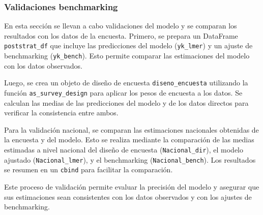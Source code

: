 \documentclass[
  12pt,
]{book}
\begin{document}
\hypertarget{validaciones-benchmarking-1}{%
\subsubsection*{Validaciones benchmarking}\label{validaciones-benchmarking-1}}

En esta sección se llevan a cabo validaciones del modelo y se comparan los resultados con los datos de la encuesta. Primero, se prepara un DataFrame \texttt{poststrat\_df} que incluye las predicciones del modelo (\texttt{yk\_lmer}) y un ajuste de benchmarking (\texttt{yk\_bench}). Esto permite comparar las estimaciones del modelo con los datos observados.

Luego, se crea un objeto de diseño de encuesta \texttt{diseno\_encuesta} utilizando la función \texttt{as\_survey\_design} para aplicar los pesos de encuesta a los datos. Se calculan las medias de las predicciones del modelo y de los datos directos para verificar la consistencia entre ambos.

Para la validación nacional, se comparan las estimaciones nacionales obtenidas de la encuesta y del modelo. Esto se realiza mediante la comparación de las medias estimadas a nivel nacional del diseño de encuesta (\texttt{Nacional\_dir}), el modelo ajustado (\texttt{Nacional\_lmer}), y el benchmarking (\texttt{Nacional\_bench}). Los resultados se resumen en un \texttt{cbind} para facilitar la comparación.

Este proceso de validación permite evaluar la precisión del modelo y asegurar que sus estimaciones sean consistentes con los datos observados y con los ajustes de benchmarking.
\end{document}
